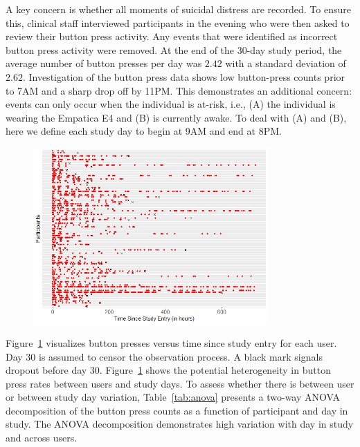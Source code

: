 \documentclass[12pt]{amsart}
\begin{document}
A key concern is whether all moments of suicidal distress are recorded.  To ensure this, clinical staff interviewed participants in the evening who were then asked to review their button press activity.  Any events that were identified as incorrect button press activity were removed.  At the end of the 30-day study period, the average number of button presses per day was $2.42$ with a standard deviation of $2.62$.  Investigation of the button press data shows low button-press counts prior to 7AM and a sharp drop off by 11PM. This demonstrates an additional concern: events can only occur when the individual is at-risk, i.e., (A) the individual is wearing the Empatica E4 and (B) is currently awake. To deal with (A) and (B), here we define each study day to begin at 9AM and end at 8PM.

\vspace{0.25cm}
\begin{figure}[!th]
    \centering
    \includegraphics[width=0.8\textwidth]{../figures/recurrentevents_plot.png}
    \label{fig:buttons}
\end{figure}
\vspace{0.25cm}

Figure~\ref{fig:buttons} visualizes button presses versus time since study entry for each user. Day 30 is assumed to censor the observation process. A black mark signals dropout before day 30.   Figure~\ref{fig:buttons} shows the potential heterogeneity in button press rates between users and study days. To assess whether there is between user or between study day variation, Table~\ref{tab:anova} presents a two-way ANOVA decomposition of the button press counts as a function of participant and day in study.  The ANOVA decomposition demonstrates high variation with day in study and across users.
\end{document}
